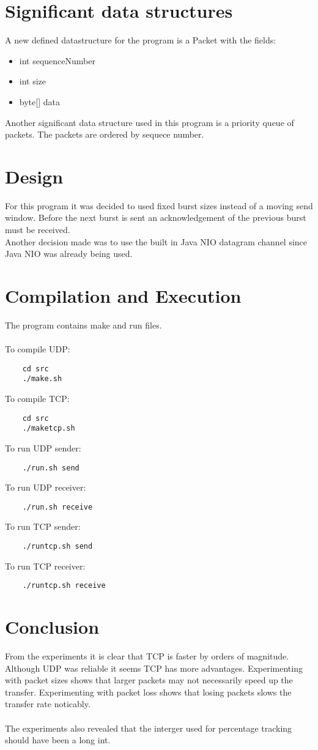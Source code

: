 \documentclass[a4paper,10pt]{article}
\begin{document}
\section{Significant data structures}
A new defined datastructure for the program is a Packet with the fields:
\begin{itemize}
	\item int sequenceNumber
	\item int size
	\item byte[] data
\end{itemize}
Another significant data structure used in this program is a priority queue of
packets. The packets are ordered by sequece number.

\section{Design}
For this program it was decided to used fixed burst sizes instead of a moving
send window. Before the next burst is sent an acknowledgement of the previous
burst must be received.\\
Another decision made was to use the built in Java NIO datagram channel since
Java NIO was already being used.

\section{Compilation and Execution}
The program contains make and run files.\\\\
To compile UDP:
\begin{verbatim}
	cd src
	./make.sh
\end{verbatim}
To compile TCP:
\begin{verbatim}
	cd src
	./maketcp.sh
\end{verbatim}
To run UDP sender:
\begin{verbatim}
	./run.sh send
\end{verbatim}
To run UDP receiver:
\begin{verbatim}
	./run.sh receive
\end{verbatim}
To run TCP sender:
\begin{verbatim}
	./runtcp.sh send
\end{verbatim}
To run TCP receiver:
\begin{verbatim}
	./runtcp.sh receive
\end{verbatim}

\section{Conclusion}
From the experiments it is clear that TCP is faster by orders of magnitude.
Although UDP was reliable it seems TCP has more advantages.
Experimenting with packet sizes shows that larger packets may not necessarily
speed up the transfer.
Experimenting with packet loss shows that losing packets slows the transfer
rate noticably.\\\\
The experiments also revealed that the interger used for percentage tracking
should have been a long int.

\pagebreak


\end{document}
